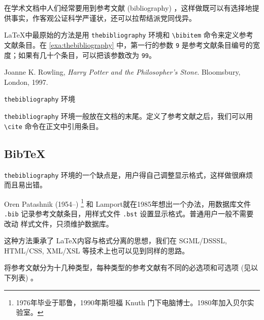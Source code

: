在学术文档中人们经常要用到参考文献 (bibliography) ，这样做既可以有选择地提供事实，作客观公证科学严谨状，还可以拉帮结派党同伐异。

\LaTeX 中最原始的方法是用 
\texttt{thebibliography} 环境和 \verb|\bibitem| 命令来定义参考文献条目。在 \autoref{exa:thebibliography} 中，第一行的参数 \texttt{9} 是参考文献条目编号的宽度；如果有几十个条目，可以把该参数改为 \texttt{99}。

\begin{example}[htbp]
\begin{BTDemo}[]
\begin{thebibliography}{9}
  Joanne K. Rowling,
  \emph{Harry Potter and the Philosopher's Stone}.
  Bloomsbury, London,
  1997.
\end{thebibliography}
\end{BTDemo}
\caption{\texttt{thebibliography} 环境}
\label{exa:thebibliography}
\end{example}

\texttt{thebibliography} 环境一般放在文档的末尾。定义了参考文献之后，我们可以用 \verb|\cite| 命令在正文中引用条目。

\begin{RLDemo}[numbers=none]
\cite{Rowling_1997}
\end{RLDemo}

\subsection{BibTeX}

\texttt{thebibliography} 环境的一个缺点是，用户得自己调整显示格式，这样做很麻烦而且易出错。

Oren Patashnik (1954--)\indexPatashnik{} \footnote{1976年毕业于耶鲁，1990年斯坦福 Knuth 门下电脑博士。1980年加入贝尔实验室。} 和 Lamport\indexLamport 就在1985年想出一个办法，用数据库文件 \texttt{.bib} 记录参考文献条目，用样式文件 \texttt{.bst} 设置显示格式。普通用户一般不需要改动 样式文件，只须维护数据库。

这种方法秉承了 \LaTeX 内容与格式分离的思想，我们在 SGML/DSSSL, HTML/CSS, XML/XSL 等技术上也可以见到同样的思路。

\BibTeX 将参考文献分为十几种类型，每种类型的参考文献有不同的必选项和可选项 (见以下列表) 。

